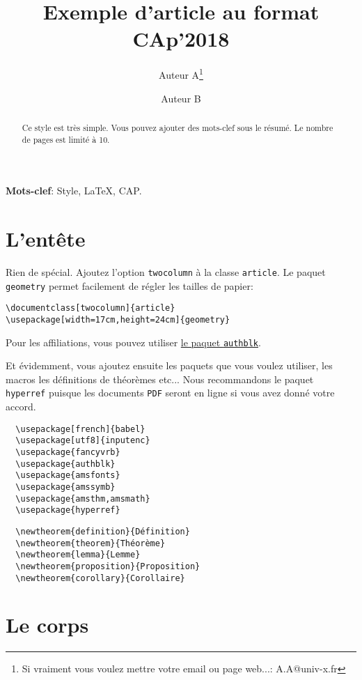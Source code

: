\documentclass[twocolumn]{article}
\title{Exemple d'article au format CAp'2018}
\author[1]{Auteur A\thanks{Si vraiment vous voulez mettre votre email
    ou page web...: A.A@univ-x.fr}}
\author[2]{Auteur B}
\affil[1]{Université X, CNRS}
\affil[2]{Université Y, CNRS et INRIA}
\begin{document}
\maketitle

\begin{abstract}
  Ce style est très simple. Vous pouvez ajouter des mots-clef sous le
  résumé. Le nombre de pages est limité à 10. 
\end{abstract}

\medskip

\noindent\textbf{Mots-clef}: Style, \LaTeX, CAP.

\section{L'entête}
\label{sec:lentete}

Rien de spécial. Ajoutez l'option \texttt{twocolumn} à la classe
\texttt{article}. Le paquet \texttt{geometry} permet facilement de
régler les tailles de papier:

\begin{Verbatim}
\documentclass[twocolumn]{article}
\usepackage[width=17cm,height=24cm]{geometry}
\end{Verbatim}

Pour les affiliations, vous pouvez utiliser
\href{http://ctan.org/pkg/authblk}{le paquet \texttt{authblk}}.


Et évidemment, vous ajoutez ensuite les paquets que vous voulez
utiliser, les macros les définitions de théorèmes etc... Nous
recommandons le paquet \texttt{hyperref} puisque les documents
\texttt{PDF} seront en ligne si vous avez donné votre accord.

\begin{Verbatim}
  \usepackage[french]{babel}
  \usepackage[utf8]{inputenc}
  \usepackage{fancyvrb}
  \usepackage{authblk}
  \usepackage{amsfonts} 
  \usepackage{amssymb}
  \usepackage{amsthm,amsmath} 
  \usepackage{hyperref}
\end{Verbatim}

\begin{Verbatim}
  \newtheorem{definition}{Définition} 
  \newtheorem{theorem}{Théorème}
  \newtheorem{lemma}{Lemme} 
  \newtheorem{proposition}{Proposition}
  \newtheorem{corollary}{Corollaire}
\end{Verbatim}

\section{Le corps}
\label{sec:le-corps}
\end{document}
